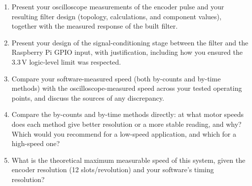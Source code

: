 \begin{reportq}
  \begin{enumerate}
    \item Present your oscilloscope measurements of the encoder pulse and your resulting filter design (topology, calculations, and component values), together with the measured response of the built filter.
    \item Present your design of the signal-conditioning stage between the filter and the Raspberry Pi GPIO input, with justification, including how you ensured the 3.3\,V logic-level limit was respected.
    \item Compare your software-measured speed (both by-counts and by-time methods) with the oscilloscope-measured speed across your tested operating points, and discuss the sources of any discrepancy.
    \item Compare the by-counts and by-time methods directly: at what motor speeds does each method give better resolution or a more stable reading, and why? Which would you recommend for a low-speed application, and which for a high-speed one?
    \item What is the theoretical maximum measurable speed of this system, given the encoder resolution (12 slots/revolution) and your software's timing resolution?
  \end{enumerate}
\end{reportq}

